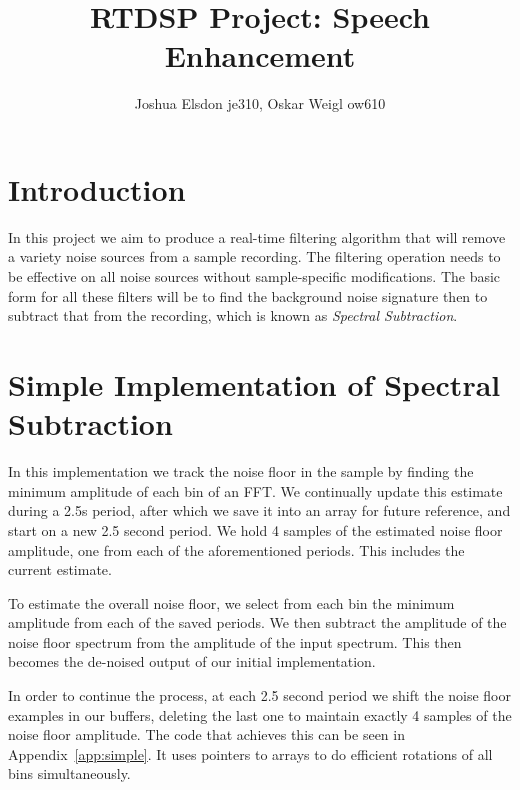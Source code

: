 \documentclass[11pt]{article} %
\title{RTDSP Project: Speech Enhancement}
\author{Joshua Elsdon je310, Oskar Weigl ow610}
\begin{document}
\maketitle
{}

\tableofcontents
\clearpage




\section{Introduction} 
In this project we aim to produce a real-time filtering algorithm that will remove a variety noise sources from a sample recording. The filtering operation needs to be effective on all noise sources without sample-specific modifications.
The basic form for all these filters will be to find the background noise signature then to subtract that from the recording, which is known as \emph{Spectral Subtraction}. 

\section{Simple Implementation of Spectral Subtraction} 
\label{sec:simple}
In this implementation we track the noise floor in the sample by finding the minimum amplitude of each bin of an FFT. We continually update this estimate during a 2.5s period, after which we save it into an array for future reference, and start on a new 2.5 second period.
We hold 4 samples of the estimated noise floor amplitude, one from each of the aforementioned periods. This includes the current estimate.

To estimate the overall noise floor, we select from each bin the minimum amplitude from each of the saved periods.
We then subtract the amplitude of the noise floor spectrum from the amplitude of the input spectrum. This then becomes the de-noised output of our initial implementation.

In order to continue the process, at each 2.5 second period we shift the noise floor examples in our buffers, deleting the last one to maintain exactly 4 samples of the noise floor amplitude. The code that achieves this can be seen in Appendix~\ref{app:simple}. It uses pointers to arrays to do efficient rotations of all bins simultaneously.
\end{document}
